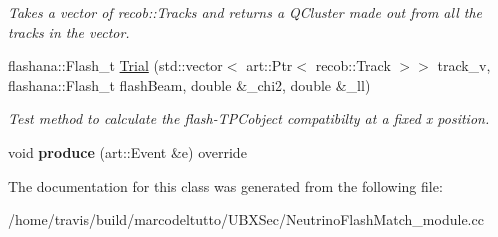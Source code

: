 \begin{DoxyCompactItemize}
\begin{DoxyCompactList}\small\item\em \-Takes a vector of recob\-::\-Tracks and returns a \-Q\-Cluster made out from all the tracks in the vector. \end{DoxyCompactList}\item 
\hypertarget{classNeutrinoFlashMatch_aa957152a8c232e4b23cc7544aa6bfdd1}{flashana\-::\-Flash\-\_\-t \hyperlink{classNeutrinoFlashMatch_aa957152a8c232e4b23cc7544aa6bfdd1}{\-Trial} (std\-::vector$<$ art\-::\-Ptr$<$ recob\-::\-Track $>$$>$ track\-\_\-v, flashana\-::\-Flash\-\_\-t flash\-Beam, double \&\-\_\-chi2, double \&\-\_\-ll)}\label{classNeutrinoFlashMatch_aa957152a8c232e4b23cc7544aa6bfdd1}

\begin{DoxyCompactList}\small\item\em \-Test method to calculate the flash-\/\-T\-P\-Cobject compatibilty at a fixed x position. \end{DoxyCompactList}\item 
\hypertarget{classNeutrinoFlashMatch_a00578af5672ff925f80c1b9482c8b4ff}{void {\bfseries produce} (art\-::\-Event \&e) override}\label{classNeutrinoFlashMatch_a00578af5672ff925f80c1b9482c8b4ff}

\end{DoxyCompactItemize}


\-The documentation for this class was generated from the following file\-:\begin{DoxyCompactItemize}
\item 
/home/travis/build/marcodeltutto/\-U\-B\-X\-Sec/\-Neutrino\-Flash\-Match\-\_\-module.\-cc\end{DoxyCompactItemize}
